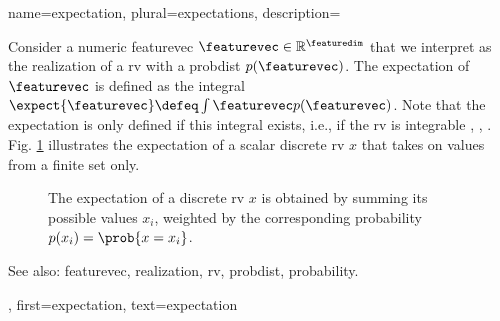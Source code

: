 {name={expectation}, plural={expectations},
  description={Consider a numeric \gls{featurevec} $\featurevec \in \mathbb{R}^{\featuredim}$ 
	that we interpret as the \gls{realization} of a \gls{rv} with a \gls{probdist} $p(\featurevec)$. 
	The expectation of $\featurevec$ is defined as the integral $\expect \{ \featurevec \} \defeq \int \featurevec p(\featurevec)$. 
	Note that the expectation is only defined if this integral exists, i.e., if the \gls{rv} is integrable 
	\cite{RudinBookPrinciplesMatheAnalysis}, \cite{BillingsleyProbMeasure}, \cite{HalmosMeasure}. 
	Fig. \ref{fig_expect_discrete_dict} illustrates the expectation of a scalar discrete \gls{rv} $x$ that takes on values 
	from a finite set only. 
   \begin{figure}[H]
   	\begin{center}
\end{center}
\vspace*{-5mm}
\caption{The expectation of a discrete \gls{rv} $x$ is obtained by summing its possible values $x_{i}$, weighted 
	by the corresponding \gls{probability} $p(x_i) = \prob{x= x_i}$. \label{fig_expect_discrete_dict}}
 \end{figure}
		See also: \gls{featurevec}, \gls{realization}, \gls{rv}, \gls{probdist}, \gls{probability}.},
first={expectation},
text={expectation}
}

